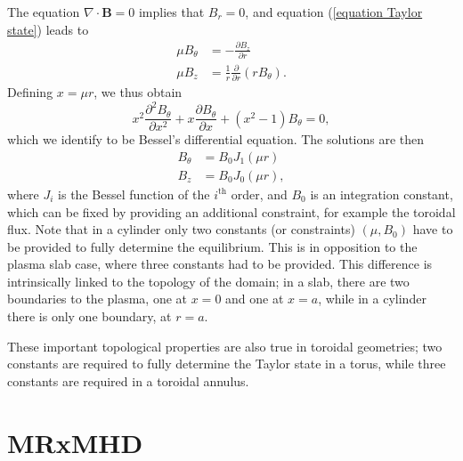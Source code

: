 \documentclass[my_thesis.tex]{subfiles}
\begin{document}
The equation $\nabla\cdot\mathbf{B}=0$ implies that $B_r=0$, and equation (\ref{equation Taylor state}) leads to
\begin{align}
	\mu B_\theta &= -\frac{\partial B_z}{\partial r}\\
	\mu B_z &= \frac{1}{r}\frac{\partial}{\partial r}(rB_\theta).
\end{align}
Defining $x=\mu r$, we thus obtain
\begin{equation}
	x^2 \frac{\partial^2 B_\theta}{\partial x^2} + x \frac{\partial B_\theta}{\partial x} + (x^2-1) B_\theta = 0,
\end{equation}
which we identify to be Bessel's differential equation. The solutions are then
\begin{align}
	B_\theta &= B_0 J_1(\mu r)\\
	B_z &= B_0 J_0(\mu r),
\end{align}
where $J_i$ is the Bessel function of the $i^{\text{th}}$ order, and $B_0$ is an integration constant, which can be fixed by providing an additional constraint, for example the toroidal flux. Note that in a cylinder only two constants (or constraints) $(\mu,B_0)$ have to be provided to fully determine the equilibrium. This is in opposition to the plasma slab case, where three constants had to be provided. This difference is intrinsically linked to the topology of the domain; in a slab, there are two boundaries to the plasma, one at $x=0$ and one at $x=a$, while in a cylinder there is only one boundary, at $r=a$. 

These important topological properties are also true in toroidal geometries; two constants are required to fully determine the Taylor state in a torus, while three constants are required in a toroidal annulus.

\section{MRxMHD}
\label{section mrxmhd}
\end{document}
